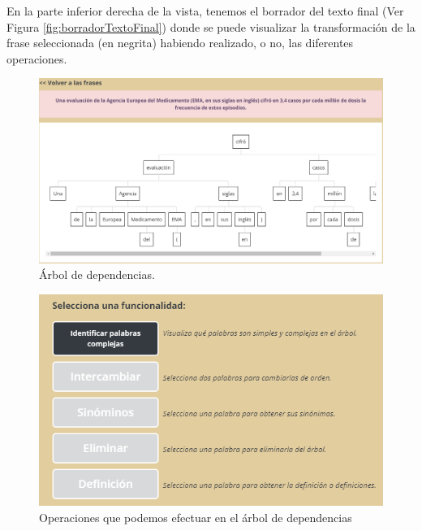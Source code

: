  En la parte inferior derecha de la vista, tenemos el borrador del texto final (Ver Figura \ref{fig:borradorTextoFinal}) donde se puede visualizar la transformación de la frase seleccionada (en negrita) habiendo realizado, o no, las diferentes operaciones. 
\begin{figure}[h!]
	\centering	
	\includegraphics[scale=0.65]{Imagenes/Figuras/arbol}	
	\caption{Árbol de dependencias.}
	\label{fig:arbolDependencias}
\end{figure}
\begin{figure}[h!]
	\centering
	\includegraphics[scale=1.0]{Imagenes/Figuras/botonesFuncionales}
	\caption{Operaciones que podemos efectuar en el árbol de dependencias}
	\label{fig:botonesFuncionales}
\end{figure}
